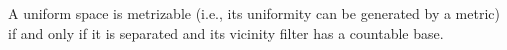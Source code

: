 A uniform space is metrizable (i.e., its uniformity can be generated by a metric) if and only if it is separated and its vicinity filter has a countable base.
